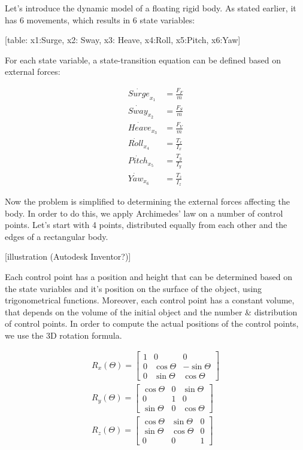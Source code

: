 Let's introduce the dynamic model of a floating rigid body. As stated earlier, it has 6 movements, which results in 6 state variables:

[table: x1:Surge, x2: Sway, x3: Heave, x4:Roll, x5:Pitch, x6:Yaw]

For each state variable, a state-transition equation can be defined based on external forces:

\begin{align}
	\dot{Surge}_{x_1} &= \frac{F_F}{m} \\
	\dot{Sway}_{x_2}  &= \frac{F_S}{m} \\
	\dot{Heave}_{x_3} &= \frac{F_V}{m} \\
	\dot{Roll}_{x_4}  &= \frac{T_x}{I_x} \\
	\dot{Pitch}_{x_5} &= \frac{T_y}{I_y} \\
	\dot{Yaw}_{x_6}   &= \frac{T_z}{I_z}
\end{align}

Now the problem is simplified to determining the external forces affecting the body. In order to do this, we apply Archimedes' law\cite{archimedes} on a number of control points. Let's start with 4 points, distributed equally from each other and the edges of a rectangular body.

[illustration (Autodesk Inventor?)]

Each control point has a position and height that can be determined based on the state variables and it's position on the surface of the object, using trigonometrical functions. Moreover, each control point has a constant volume, that depends on the volume of the initial object and the number \& distribution of control points. In order to compute the actual positions of the control points, we use the 3D rotation formula.

\begin{align}
	R_x(\Theta) = 
	\begin{bmatrix}
		1 & 0 & 0 \\
		0 & \cos \Theta & -\sin \Theta \\
		0 & \sin \Theta & \cos \Theta
	\end{bmatrix} \\
	R_y(\Theta) = 
	\begin{bmatrix}
		\cos \Theta & 0 & \sin \Theta \\
		0 & 1 & 0 \\
		\sin \Theta & 0 &\cos \Theta
	\end{bmatrix}
 \\
	R_z(\Theta) = 
	\begin{bmatrix}
		\cos \Theta & \sin \Theta & 0 \\
		\sin \Theta & \cos \Theta & 0 \\
		0 & 0 & 1
	\end{bmatrix}
\end{align}

